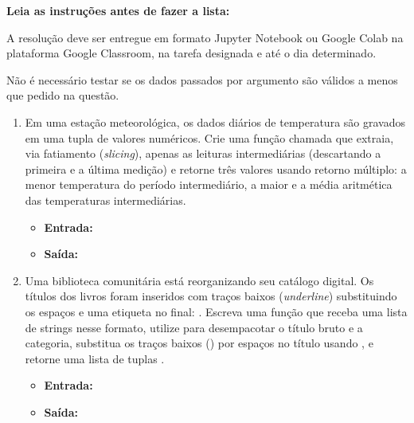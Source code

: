 
\vspace{1cm}

\noindent  \textbf{Leia as instruções antes de fazer a lista:}

\vspace{0.3cm}
\noindent A resolução deve ser entregue em formato Jupyter Notebook ou Google Colab na plataforma Google Classroom, na tarefa designada e até o dia determinado.

\noindent  Não é necessário testar se os dados passados por argumento são válidos a menos que pedido na questão.


\vspace{0.5cm}


\begin{enumerate}[label=\textbf{Q\arabic*.}]

\item Em uma estação meteorológica, os dados diários de temperatura são gravados em uma tupla de valores numéricos. Crie uma função chamada  que extraia, via fatiamento (\emph{slicing}), apenas as leituras intermediárias (descartando a primeira e a última medição) e retorne três valores usando retorno múltiplo: a menor temperatura do período intermediário, a maior e a média aritmética das temperaturas intermediárias.

\begin{itemize}[leftmargin=*]
    \item \textbf{Entrada:} 
    \item \textbf{Saída:} 
\end{itemize}






\item Uma biblioteca comunitária está reorganizando seu catálogo digital. Os títulos dos livros foram inseridos com traços baixos (\textit{underline}) substituindo os espaços e uma etiqueta no final: . Escreva uma função  que receba uma lista de strings nesse formato, utilize  para desempacotar o título bruto e a categoria, substitua os traços baixos (\code{\_}) por espaços no título usando , e retorne uma lista de tuplas .

\begin{itemize}[leftmargin=*]
    \item \textbf{Entrada:} 
    \item \textbf{Saída:} 
\end{itemize}


\end{enumerate}
